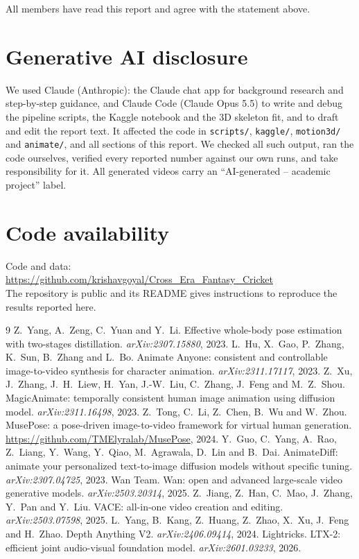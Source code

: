 \documentclass[11pt,a4paper,twocolumn]{article}
\newcommand{\githuburl}{https://github.com/krishavgoyal/Cross_Era_Fantasy_Cricket}
\begin{document}
\smallskip
\noindent All members have read this report and agree with the statement above.

\section*{Generative AI disclosure}
We used Claude (Anthropic): the Claude chat app for background research and step-by-step guidance, and Claude Code
(Claude Opus 5.5) to write and debug the pipeline scripts, the Kaggle notebook and the 3D skeleton fit, and to draft
and edit the report text. It affected the code in \texttt{scripts/}, \texttt{kaggle/}, \texttt{motion3d/} and
\texttt{animate/}, and all sections of this report. We checked all such output, ran the code ourselves, verified every
reported number against our own runs, and take responsibility for it. All generated videos carry an
``AI-generated -- academic project'' label.

\section*{Code availability}
\noindent Code and data:\\
\url{\githuburl}\\
The repository is public and its README gives instructions to reproduce the results reported here.

\begin{thebibliography}{9}
\small
{}
Z.~Yang, A.~Zeng, C.~Yuan and Y.~Li.
\newblock Effective whole-body pose estimation with two-stages distillation.
\newblock \emph{arXiv:2307.15880}, 2023.
L.~Hu, X.~Gao, P.~Zhang, K.~Sun, B.~Zhang and L.~Bo.
\newblock Animate Anyone: consistent and controllable image-to-video synthesis for character animation.
\newblock \emph{arXiv:2311.17117}, 2023.
Z.~Xu, J.~Zhang, J.~H.~Liew, H.~Yan, J.-W.~Liu, C.~Zhang, J.~Feng and M.~Z.~Shou.
\newblock MagicAnimate: temporally consistent human image animation using diffusion model.
\newblock \emph{arXiv:2311.16498}, 2023.
Z.~Tong, C.~Li, Z.~Chen, B.~Wu and W.~Zhou.
\newblock MusePose: a pose-driven image-to-video framework for virtual human generation.
\newblock \url{https://github.com/TMElyralab/MusePose}, 2024.
Y.~Guo, C.~Yang, A.~Rao, Z.~Liang, Y.~Wang, Y.~Qiao, M.~Agrawala, D.~Lin and B.~Dai.
\newblock AnimateDiff: animate your personalized text-to-image diffusion models without specific tuning.
\newblock \emph{arXiv:2307.04725}, 2023.
Wan Team.
\newblock Wan: open and advanced large-scale video generative models.
\newblock \emph{arXiv:2503.20314}, 2025.
Z.~Jiang, Z.~Han, C.~Mao, J.~Zhang, Y.~Pan and Y.~Liu.
\newblock VACE: all-in-one video creation and editing.
\newblock \emph{arXiv:2503.07598}, 2025.
L.~Yang, B.~Kang, Z.~Huang, Z.~Zhao, X.~Xu, J.~Feng and H.~Zhao.
\newblock Depth Anything V2.
\newblock \emph{arXiv:2406.09414}, 2024.
Lightricks.
\newblock LTX-2: efficient joint audio-visual foundation model.
\newblock \emph{arXiv:2601.03233}, 2026.
\end{thebibliography}
\end{document}
